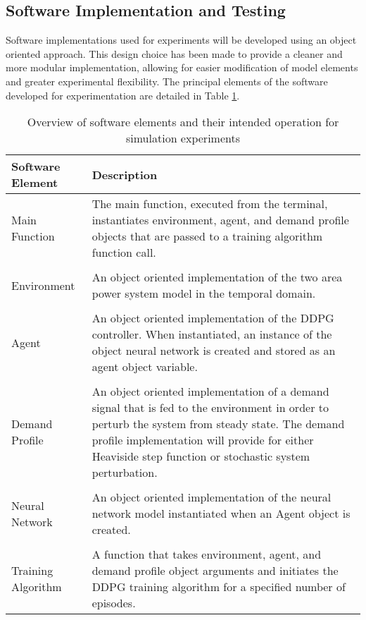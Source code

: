 \subsection{Software Implementation and Testing}
Software implementations used for experiments will be developed using an object oriented approach. This design choice has been made to provide a cleaner and more modular implementation, allowing for easier modification of model elements and greater experimental flexibility. The principal elements of the software developed for experimentation are detailed in Table \ref{tab:software_elements}.
\begin{table}[h]
	\centering
	\caption{Overview of software elements and their intended operation for simulation experiments}
	\begin{tabular}{lp{10cm}}
		\toprule
		\textbf{Software Element} & \textbf{Description} \\
		\midrule
		Main Function & The main function, executed from the terminal, instantiates environment, agent, and demand profile objects that are passed to a training algorithm function call.\\
		 & \\
		Environment & An object oriented implementation of the two area power system model in the temporal domain.\\
		 & \\
		Agent & An object oriented implementation of the DDPG controller. When instantiated, an instance of the object neural network is created and stored as an agent object variable. \\
		 & \\
		Demand Profile & An object oriented implementation of a demand signal that is fed to the environment in order to perturb the system from steady state. The demand profile implementation will provide for either Heaviside step function or stochastic system perturbation.\\
		 & \\
		Neural Network & An object oriented implementation of the neural network model instantiated when an Agent object is created.\\
		 & \\
		Training Algorithm & A function that takes environment, agent, and demand profile object arguments and initiates the DDPG training algorithm for a specified number of episodes.\\
		\bottomrule
	\end{tabular}
	\label{tab:software_elements}
\end{table}

